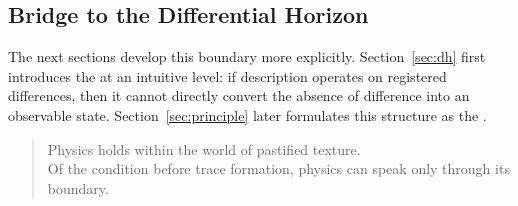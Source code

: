 \subsection*{Bridge to the Differential Horizon}

The next sections develop this boundary more explicitly.
Section~\ref{sec:dh} first introduces the \DH{} at an intuitive level:
if description operates on registered differences,
then it cannot directly convert the absence of difference into an
observable state.
Section~\ref{sec:principle} later formulates this structure as the
\DHP{}.

\medskip
\begin{quote}
Physics holds within the world of pastified texture.\\
Of the condition before trace formation,
physics can speak only through its boundary.
\end{quote}
